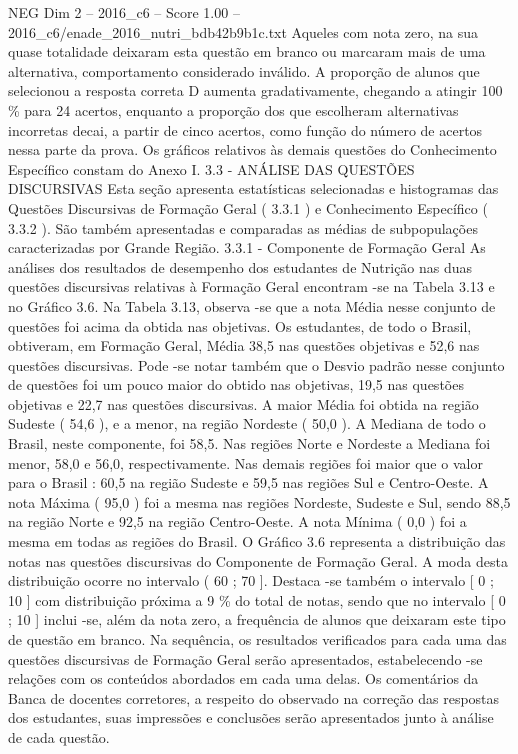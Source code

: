 \begin{textsample}{NEG Dim 2 – 2016\_c6 – Score 1.00 – 2016\_c6/enade\_2016\_nutri\_bdb42b9b1c.txt}
Aqueles com nota zero, na sua quase totalidade deixaram esta questão em branco ou marcaram mais de uma alternativa, comportamento considerado inválido.
A proporção de alunos que selecionou a resposta correta D aumenta gradativamente, chegando a atingir 100 \% para 24 acertos, enquanto a proporção dos que escolheram alternativas incorretas decai, a partir de cinco acertos, como função do número de acertos nessa parte da prova.
Os gráficos relativos às demais questões do Conhecimento Específico constam do Anexo I. 3.3 - ANÁLISE DAS QUESTÕES DISCURSIVAS Esta seção apresenta estatísticas selecionadas e histogramas das Questões Discursivas de Formação Geral ( 3.3.1 ) e Conhecimento Específico ( 3.3.2 ).
São também apresentadas e comparadas as médias de subpopulações caracterizadas por Grande Região. 3.3.1 - Componente de Formação Geral As análises dos resultados de desempenho dos estudantes de Nutrição nas duas questões discursivas relativas à Formação Geral encontram -se na Tabela 3.13 e no Gráfico 3.6.
Na Tabela 3.13, observa -se que a nota Média nesse conjunto de questões foi acima da obtida nas objetivas.
Os estudantes, de todo o Brasil, obtiveram, em Formação Geral, Média 38,5 nas questões objetivas e 52,6 nas questões discursivas.
Pode -se notar também que o Desvio padrão nesse conjunto de questões foi um pouco maior do obtido nas objetivas, 19,5 nas questões objetivas e 22,7 nas questões discursivas.
A maior Média foi obtida na região Sudeste ( 54,6 ), e a menor, na região Nordeste ( 50,0 ).
A Mediana de todo o Brasil, neste componente, foi 58,5.
Nas regiões Norte e Nordeste a Mediana foi menor, 58,0 e 56,0, respectivamente.
Nas demais regiões foi maior que o valor para o Brasil : 60,5 na região Sudeste e 59,5 nas regiões Sul e Centro-Oeste.
A nota Máxima ( 95,0 ) foi a mesma nas regiões Nordeste, Sudeste e Sul, sendo 88,5 na região Norte e 92,5 na região Centro-Oeste.
A nota Mínima ( 0,0 ) foi a mesma em todas as regiões do Brasil.
O Gráfico 3.6 representa a distribuição das notas nas questões discursivas do Componente de Formação Geral.
A moda desta distribuição ocorre no intervalo ( 60 ; 70 ].
Destaca -se também o intervalo [ 0 ; 10 ] com distribuição próxima a 9 \% do total de notas, sendo que no intervalo [ 0 ; 10 ] inclui -se, além da nota zero, a frequência de alunos que deixaram este tipo de questão em branco.
Na sequência, os resultados verificados para cada uma das questões discursivas de Formação Geral serão apresentados, estabelecendo -se relações com os conteúdos abordados em cada uma delas.
Os comentários da Banca de docentes corretores, a respeito do observado na correção das respostas dos estudantes, suas impressões e conclusões serão apresentados junto à análise de cada questão.

\end{textsample}
